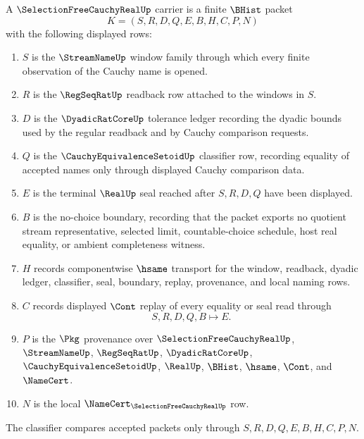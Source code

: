 \begin{definition}
\label{def:real-cauchy-selection-free-carrier}
A $\SelectionFreeCauchyRealUp$ carrier is a finite $\BHist$ packet
$$
K=(S,R,D,Q,E,B,H,C,P,N)
$$
with the following displayed rows:
\begin{enumerate}
\item $S$ is the $\StreamNameUp$ window family through which every finite observation of the Cauchy name is opened.
\item $R$ is the $\RegSeqRatUp$ readback row attached to the windows in $S$.
\item $D$ is the $\DyadicRatCoreUp$ tolerance ledger recording the dyadic bounds used by the regular readback and by Cauchy comparison requests.
\item $Q$ is the $\CauchyEquivalenceSetoidUp$ classifier row, recording equality of accepted names only through displayed Cauchy comparison data.
\item $E$ is the terminal $\RealUp$ seal reached after $S,R,D,Q$ have been displayed.
\item $B$ is the no-choice boundary, recording that the packet exports no quotient stream representative, selected limit, countable-choice schedule, host real equality, or ambient completeness witness.
\item $H$ records componentwise $\hsame$ transport for the window, readback, dyadic ledger, classifier, seal, boundary, replay, provenance, and local naming rows.
\item $C$ records displayed $\Cont$ replay of every equality or seal read through
$$
S,R,D,Q,B \longmapsto E .
$$
\item $P$ is the $\Pkg$ provenance over $\SelectionFreeCauchyRealUp$, $\StreamNameUp$, $\RegSeqRatUp$, $\DyadicRatCoreUp$, $\CauchyEquivalenceSetoidUp$, $\RealUp$, $\BHist$, $\hsame$, $\Cont$, and $\NameCert$.
\item $N$ is the local $\NameCert_{\SelectionFreeCauchyRealUp}$ row.
\end{enumerate}
The classifier compares accepted packets only through $S,R,D,Q,E,B,H,C,P,N$.
\end{definition}

